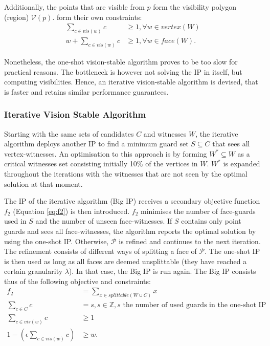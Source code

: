 Additionally, the points that are visible from $p$ form the visibility polygon (region) $\mathcal V(p)$. form their own constraints: 
	\begin{align*}
		\sum_{c \in vis(w)} c &\geq 1, \forall w \in vertex(W) \\
		w + \sum_{c \in vis(w)} c &\geq 1, \forall w \in face(W).
	\end{align*}

Nonetheless, the one-shot vision-stable algorithm proves to be too slow for practical reasons. The bottleneck is however not solving the IP in itself, but computing visibilities. Hence, an iterative vision-stable algorithm is devised, that is faster and retains similar performance guarantees. 

\subsubsection{Iterative Vision Stable Algorithm}
Starting with the same sets of candidates $C$ and witnesses $W$, the iterative algorithm deploys another IP to find a minimum guard set $S \subseteq C$ that sees all vertex-witnesses. An optimisation to this approach is by forming $W^* \subseteq W$ as a critical witnesses set consisting initially 10\% of the vertices in $W$. $W^*$ is expanded throughout the iterations with the witnesses that are not seen by the optimal solution at that moment. 

The IP of the iterative algorithm (Big IP) receives a secondary objective function $f_2$ (Equation \ref{eq:f2}) is then introduced. $f_2$ minimises the number of face-guards used in $S$ and the number of unseen face-witnesses. If $S$ contains only point guards and sees all face-witnesses, the algorithm reports the optimal solution by using the one-shot IP. Otherwise, $\mathcal P$ is refined and continues to the next iteration. The refinement consists of different ways of splitting a face of $\mathcal P$. The one-shot IP is then used as long as all faces are deemed unsplittable (they have reached a certain granularity $\lambda$). In that case, the Big IP is run again. The Big IP consists thus of the following objective and constraints: 
\begin{align}
	f_2 &= \sum_{x \in splittable(W \cup C)} x \label{eq:f2}\\
	\sum_{c \in C} c &= s, s \in \mathbb Z, s \text{ the number of used guards in the one-shot IP} \\
	\sum_{c \in vis(w)} c &\geq 1 \\
	1 - (\epsilon \sum_{c \in vis(w)} c) &\geq w.
\end{align}

